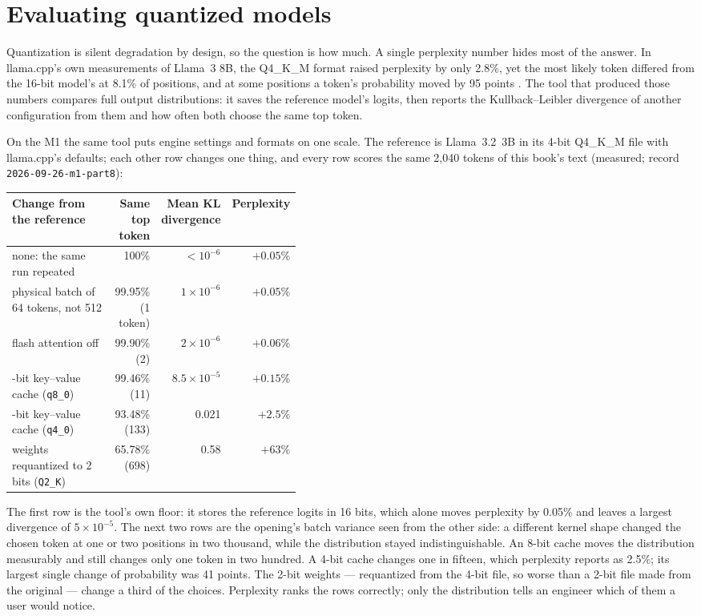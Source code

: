 \section{Evaluating quantized models}

Quantization is silent degradation by design, so the question is how much. A
single perplexity number hides most of the answer. In llama.cpp's own
measurements of Llama~3 8B, the Q4\_K\_M format raised perplexity by only 2.8\%,
yet the most likely token differed from the 16-bit model's at 8.1\% of
positions, and at some positions a token's probability moved by 95 points
\cite{llamacpp2026perplexity}. The tool that produced those numbers compares
full output distributions: it saves the reference model's logits, then reports
the Kullback--Leibler divergence of another configuration from them and how
often both choose the same top token.

On the M1 the same tool puts engine settings and formats on one scale. The
reference is Llama~3.2~3B in its 4-bit Q4\_K\_M file with llama.cpp's defaults;
each other row changes one thing, and every row scores the same 2,040 tokens of
this book's text (measured; record \texttt{2026-09-26-m1-part8}):

\begin{center}\small
\begin{tabular}{@{}>{\raggedright\arraybackslash}p{0.42\linewidth}rrr@{}}
\toprule
Change from the reference & Same top token & Mean KL divergence & Perplexity \\
\midrule
none: the same run repeated & 100\% & $< 10^{-6}$ & $+0.05$\% \\
physical batch of 64 tokens, not 512 & 99.95\% (1 token) & $1 \times 10^{-6}$ & $+0.05$\% \\
flash attention off & 99.90\% (2) & $2 \times 10^{-6}$ & $+0.06$\% \\
8-bit key--value cache (\texttt{q8\_0}) & 99.46\% (11) & $8.5 \times 10^{-5}$ & $+0.15$\% \\
4-bit key--value cache (\texttt{q4\_0}) & 93.48\% (133) & 0.021 & $+2.5$\% \\
weights requantized to 2 bits (\texttt{Q2\_K}) & 65.78\% (698) & 0.58 & $+63$\% \\
\bottomrule
\end{tabular}
\end{center}

The first row is the tool's own floor: it stores the reference logits in 16
bits, which alone moves perplexity by 0.05\% and leaves a largest divergence of
$5 \times 10^{-5}$. The next two rows are the opening's batch variance seen from
the other side: a different kernel shape changed the chosen token at one or two
positions in two thousand, while the distribution stayed indistinguishable. An
8-bit cache moves the distribution measurably and still changes only one token
in two hundred. A 4-bit cache changes one in fifteen, which perplexity reports
as 2.5\%; its largest single change of probability was 41 points. The 2-bit
weights --- requantized from the 4-bit file, so worse than a 2-bit file made
from the original --- change a third of the choices. Perplexity ranks the rows
correctly; only the distribution tells an engineer which of them a user would
notice.

